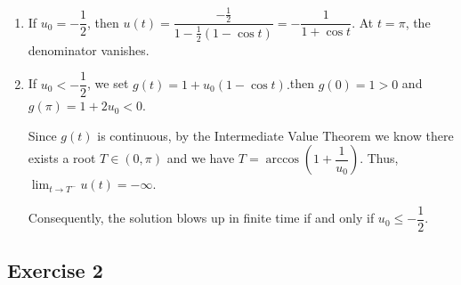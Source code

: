 \documentclass[11pt]{article}
\begin{document}
\begin{enumerate}
\begin{enumerate}[label=\Roman*. ]
        \item If $ u_0=-\dfrac12$, then $u(t) =\dfrac{-\frac12}{1-\frac12(1-\cos t)} =-\dfrac{1}{1+\cos t}.$ At $t=\pi$, the denominator vanishes.
        \item If $u_0<-\dfrac12$, we set $ g(t)=1+u_0(1-\cos t).$then $g(0)=1>0$ and $g(\pi)=1+2u_0<0.$ 
        
        Since $g(t)$ is continuous, by the Intermediate Value Theorem we know there exists a root $T\in(0,\pi)$ and we have $T=\arccos\left(1+\dfrac{1}{u_0}\right)$. Thus, $\displaystyle \lim_{t\to T^-}u(t)=-\infty.$ 
        
        Consequently, the solution blows up in finite time if and only if $u_0\leq-\dfrac{1}{2}$.
    \end{enumerate}
\end{enumerate}

\subsection{Exercise 2} \label{E2}
\end{document}
